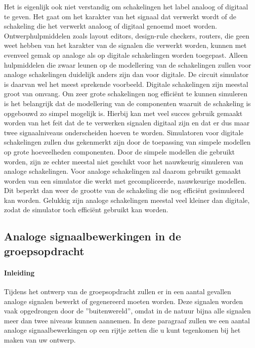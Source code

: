 Het is eigenlijk ook niet verstandig om schakelingen het label analoog of digitaal te geven.
Het gaat om het karakter van het signaal dat verwerkt wordt of de schakeling die het verwerkt analoog of digitaal genoemd moet worden.
Ontwerphulpmiddelen zoals layout editors, design-rule checkers, routers, die geen weet hebben van het karakter van de signalen die verwerkt worden, kunnen met evenveel gemak op analoge als op digitale schakelingen worden toegepast.
Alleen hulpmiddelen die zwaar leunen op de modellering van de schakelingen zullen voor analoge schakelingen duidelijk anders zijn dan voor digitale.
De circuit simulator is daarvan wel het meest sprekende voorbeeld.
Digitale schakelingen zijn meestal groot van omvang.
Om zeer grote schakelingen nog effici\"ent te kunnen simuleren is het belangrijk dat de modellering van de componenten waaruit de schakeling is opgebouwd zo simpel mogelijk is.
Hierbij kan met veel succes gebruik gemaakt worden van het feit dat de te verwerken signalen digitaal zijn en dat er dus maar twee signaalniveaus onderscheiden hoeven te worden.
Simulatoren voor digitale schakelingen zullen dus gekenmerkt zijn door de toepassing van simpele modellen op grote hoeveelheden componenten.
Door de simpele modellen die gebruikt worden, zijn ze echter meestal niet geschikt voor het nauwkeurig simuleren van analoge schakelingen. 
Voor analoge schakelingen zal daarom gebruikt gemaakt worden van een simulator die werkt met gecompliceerde, nauwkeurige modellen.
Dit beperkt dan weer de grootte van de schakeling die nog effici\"ent gesimuleerd kan worden.
Gelukkig zijn analoge schakelingen meestal veel kleiner dan digitale, zodat de simulator toch effici\"ent gebruikt kan worden.

\subsection{Analoge signaalbewerkingen in de groepsopdracht}

\paragraph{Inleiding}

Tijdens het ontwerp van de groepsopdracht zullen er in een aantal gevallen 
analoge signalen bewerkt of gegenereerd moeten worden. Deze signalen worden vaak opgedrongen door de ''buitenwereld'', omdat in de natuur bijna alle signalen meer dan twee niveaus kunnen aannemen. In deze paragraaf zullen we een aantal analoge signaalbewerkingen op een rijtje zetten die u kunt tegenkomen bij het maken van uw ontwerp.
